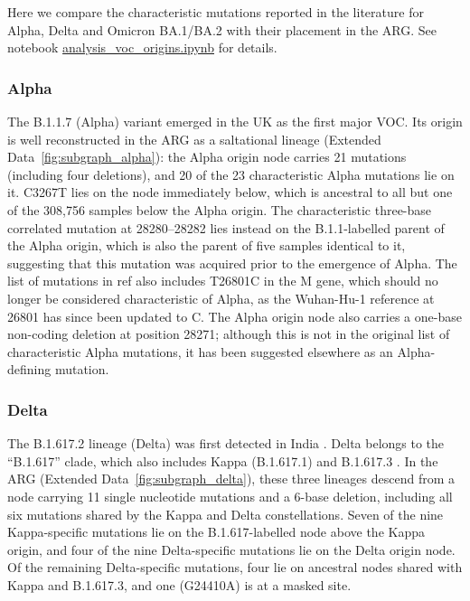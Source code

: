 \documentclass[12pt]{article}
\newcommand{\edref}[1]{Extended Data~\ref{#1}}
\begin{document}
Here we compare the characteristic mutations
reported in the literature for Alpha, Delta and Omicron BA.1/BA.2
with their placement in the ARG.
See notebook
\href{https://github.com/jeromekelleher/sc2ts-paper/blob/main/notebooks/analysis\_voc\_origins.ipynb}
{analysis\_voc\_origins.ipynb} for details.

\subsubsection{Alpha}
\label{sec:dd_alpha}

The B.1.1.7 (Alpha) variant emerged in the UK as the first major VOC.
Its origin is well reconstructed in the ARG as a saltational lineage
(\edref{fig:subgraph_alpha}):
the Alpha origin node carries 21 mutations (including four deletions),
and 20 of the 23 characteristic Alpha mutations \cite{RambautAlpha2020}
lie on it.
C3267T lies on the node immediately below,
which is ancestral to all but one of the 308,756 samples
below the Alpha origin.
The characteristic three-base correlated mutation at 28280--28282
lies instead on the B.1.1-labelled parent of the Alpha origin,
which is also the parent of five samples identical to it,
suggesting that this mutation was acquired prior to the emergence of Alpha.
The list of mutations in ref\cite{RambautAlpha2020}
also includes T26801C in the M gene,
which should no longer be considered characteristic of Alpha,
as the Wuhan-Hu-1 reference at 26801 has since been updated to C.
The Alpha origin node also carries a one-base non-coding deletion
at position 28271;
although this is not in the original list of
characteristic Alpha mutations,
it has been suggested elsewhere as an Alpha-defining
mutation\cite{Li2023indels}.

\subsubsection{Delta}
\label{sec:dd_delta}

The B.1.617.2 lineage (Delta) was first detected in India \cite{ECDCreport}.
Delta belongs to the ``B.1.617'' clade,
which also includes Kappa (B.1.617.1) and B.1.617.3 \cite{ECDCreport}.
In the ARG (\edref{fig:subgraph_delta}), these three lineages descend from a node
carrying 11 single nucleotide mutations and a 6-base deletion,
including all six mutations shared by the
Kappa and Delta constellations\cite{ScorpioKappa,ScorpioDelta}.
Seven of the nine Kappa-specific mutations
lie on the B.1.617-labelled node above the Kappa origin,
and four of the nine Delta-specific mutations lie on the Delta origin node.
Of the remaining Delta-specific mutations,
four lie on ancestral nodes shared with Kappa and B.1.617.3,
and one (G24410A) is at a masked site.
\end{document}
